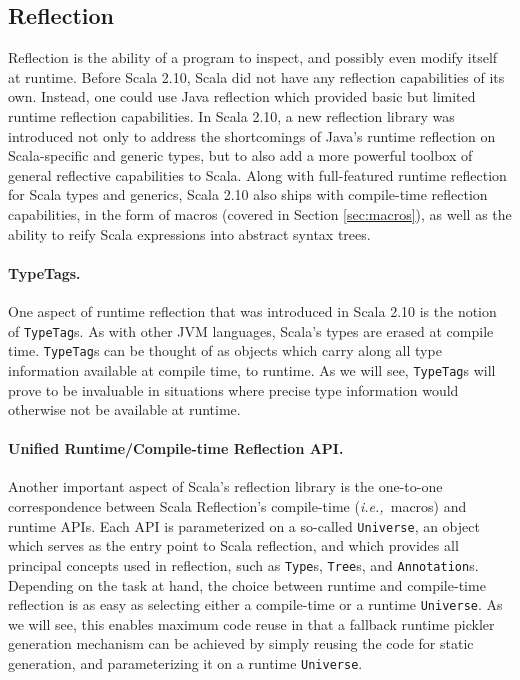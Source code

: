 \documentclass[preprint,10pt]{sigplanconf}
\theoremstyle{definition}
\theoremstyle{definition}
\newcommand{\ie}{{\em i.e.,~}}
\begin{document}

\subsection{Reflection}
\label{sec:reflection}

Reflection is the ability of a program to inspect, and possibly even modify
itself at runtime. Before Scala 2.10, Scala did not have any reflection
capabilities of its own. Instead, one could use Java reflection which provided
basic but limited runtime reflection capabilities. In Scala 2.10, a new
reflection library was introduced not only to address the shortcomings of
Java's runtime reflection on Scala-specific and generic types, but to also add
a more powerful toolbox of general reflective capabilities to Scala. Along
with full-featured runtime reflection for Scala types and generics, Scala 2.10
also ships with compile-time reflection capabilities, in the form of macros
(covered in Section \ref{sec:macros}), as well as the ability to reify Scala
expressions into abstract syntax trees.

\paragraph{TypeTags.} One aspect of runtime reflection that was introduced in
Scala 2.10 is the notion of \verb|TypeTag|s. As with other JVM languages,
Scala's types are erased at compile time. \verb|TypeTag|s can be thought of as
objects which carry along all type information available at compile time, to
runtime. As we will see, \verb|TypeTag|s will prove to be invaluable in
situations where precise type information would otherwise not be available at runtime.

\paragraph{Unified Runtime/Compile-time Reflection API.} Another important
aspect of Scala's reflection library is the one-to-one correspondence between
Scala Reflection's compile-time (\ie macros) and runtime APIs. Each API is
parameterized on a so-called \verb|Universe|, an object which serves as the
entry point to Scala reflection, and which provides all principal concepts
used in reflection, such as \verb|Type|s, \verb|Tree|s, and
\verb|Annotation|s. Depending on the task at hand, the choice between runtime
and compile-time reflection is as easy as selecting either a compile-time or a
runtime \verb|Universe|. As we will see, this enables maximum code
reuse in that a fallback runtime pickler generation mechanism can be achieved
by simply reusing the code for static generation, and parameterizing it on a
runtime \verb|Universe|.
\end{document}
